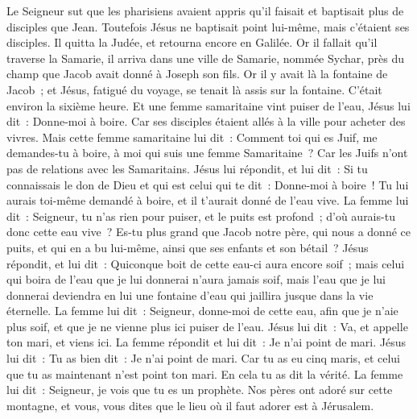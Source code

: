\begin{multicols}{2}
\VerseOne{}Le Seigneur sut que les pharisiens avaient appris qu'il faisait et baptisait plus de disciples que Jean.
Toutefois Jésus ne baptisait point lui-même, mais c'étaient ses disciples.
Il quitta la Judée, et retourna encore en Galilée.
Or il fallait qu'il traverse la Samarie,
il arriva dans une ville de Samarie, nommée Sychar, près du champ que Jacob avait donné à Joseph son fils.
Or il y avait là la fontaine de Jacob~; et Jésus, fatigué du voyage, se tenait là assis sur la fontaine. C'était environ la sixième heure.
Et une femme samaritaine vint puiser de l'eau, Jésus lui dit~: Donne-moi à boire.
Car ses disciples étaient allés à la ville pour acheter des vivres.
Mais cette femme samaritaine lui dit~: Comment toi qui es Juif, me demandes-tu à boire, à moi qui suis une femme Samaritaine~? Car les Juifs n'ont pas de relations avec les Samaritains.
Jésus lui répondit, et lui dit~: Si tu connaissais le don de Dieu et qui est celui qui te dit~: Donne-moi à boire~! Tu lui aurais toi-même demandé à boire, et il t'aurait donné de l'eau vive.
La femme lui dit~: Seigneur, tu n'as rien pour puiser, et le puits est profond~; d'où aurais-tu donc cette eau vive~?
Es-tu plus grand que Jacob notre père, qui nous a donné ce puits, et qui en a bu lui-même, ainsi que ses enfants et son bétail~?
Jésus répondit, et lui dit~: Quiconque boit de cette eau-ci aura encore soif~;
mais celui qui boira de l'eau que je lui donnerai n'aura jamais soif, mais l'eau que je lui donnerai deviendra en lui une fontaine d'eau qui jaillira jusque dans la vie éternelle.
La femme lui dit~: Seigneur, donne-moi de cette eau, afin que je n'aie plus soif, et que je ne vienne plus ici puiser de l'eau.
Jésus lui dit~: Va, et appelle ton mari, et viens ici.
La femme répondit et lui dit~: Je n'ai point de mari. Jésus lui dit~: Tu as bien dit~: Je n'ai point de mari.
Car tu as eu cinq maris, et celui que tu as maintenant n'est point ton mari. En cela tu as dit la vérité.
La femme lui dit~: Seigneur, je vois que tu es un prophète.
Nos pères ont adoré sur cette montagne, et vous, vous dites que le lieu où il faut adorer est à Jérusalem.

\end{multicols}
